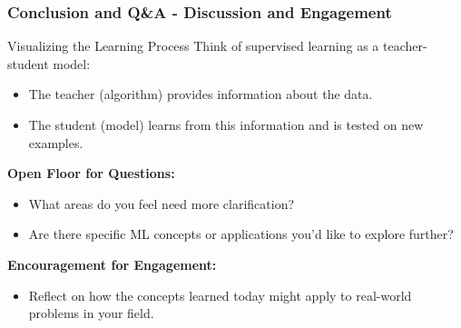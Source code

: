 \documentclass[aspectratio=169]{beamer}
\begin{document}
\begin{frame}[fragile]
    \frametitle{Conclusion and Q\&A - Discussion and Engagement}
    \begin{block}{Visualizing the Learning Process}
        Think of supervised learning as a teacher-student model:
        \begin{itemize}
            \item The teacher (algorithm) provides information about the data.
            \item The student (model) learns from this information and is tested on new examples.
        \end{itemize}
    \end{block}

    \textbf{Open Floor for Questions:}
    \begin{itemize}
        \item What areas do you feel need more clarification?
        \item Are there specific ML concepts or applications you’d like to explore further?
    \end{itemize}

    \textbf{Encouragement for Engagement:}
    \begin{itemize}
        \item Reflect on how the concepts learned today might apply to real-world problems in your field.
    \end{itemize}
\end{frame}
\end{document}
